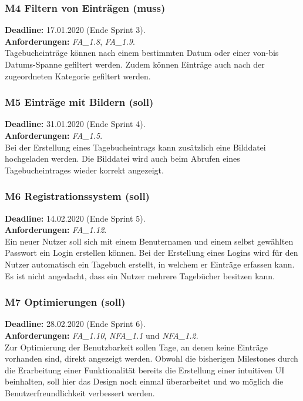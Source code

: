 \subsubsection{M4 Filtern von Einträgen (muss)}
\textbf{Deadline: } 17.01.2020 (Ende Sprint 3). \\
\textbf{Anforderungen: }\emph{FA\_1.8}, \emph{FA\_1.9}.\\
Tagebucheinträge können nach einem bestimmten Datum oder einer von-bis Datums-Spanne gefiltert werden. Zudem können Einträge auch nach der zugeordneten Kategorie gefiltert werden.

\subsubsection{M5 Einträge mit Bildern (soll)}
\textbf{Deadline: } 31.01.2020 (Ende Sprint 4). \\
\textbf{Anforderungen: }\emph{FA\_1.5}.\\
Bei der Erstellung eines Tagebucheintrags kann zusätzlich eine Bilddatei hochgeladen werden. Die Bilddatei wird auch beim Abrufen eines Tagebucheintrages wieder korrekt angezeigt.

\subsubsection{M6 Registrationssystem (soll)}
\textbf{Deadline: } 14.02.2020 (Ende Sprint 5). \\
\textbf{Anforderungen: }\emph{FA\_1.12}.\\
Ein neuer Nutzer soll sich mit einem Benuternamen und einem selbst gewählten Passwort ein Login erstellen können. Bei der Erstellung eines Logins wird für den Nutzer automatisch ein Tagebuch erstellt, in welchem er Einträge erfassen kann. Es ist nicht angedacht, dass ein Nutzer mehrere Tagebücher besitzen kann.

\subsubsection{M7 Optimierungen (soll)}
\textbf{Deadline: } 28.02.2020 (Ende Sprint 6). \\
\textbf{Anforderungen: }\emph{FA\_1.10}, \emph{NFA\_1.1} und \emph{NFA\_1.2}.\\
Zur Optimierung der Benutzbarkeit sollen Tage, an denen keine Einträge vorhanden sind, direkt angezeigt werden. Obwohl die bisherigen Milestones durch die Erarbeitung einer Funktionalität bereits die Erstellung einer intuitiven UI beinhalten, soll hier das Design noch einmal überarbeitet und wo möglich die Benutzerfreundlichkeit verbessert werden.
